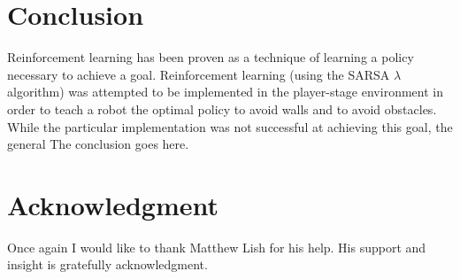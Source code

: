 \documentclass[conference]{IEEEtran}
\begin{document}
%



\section{Conclusion}
Reinforcement learning has been proven as a technique of learning a policy necessary to achieve a goal. 
Reinforcement learning (using the SARSA $\lambda$ algorithm) was attempted to be implemented in the player-stage environment in order to teach a robot the optimal policy to avoid walls and to avoid obstacles.
While the particular implementation was not successful at achieving this goal, the general 
The conclusion goes here.



\section*{Acknowledgment}
Once again I would like to thank Matthew Lish for his help.  His support and insight is gratefully acknowledgment.



\end{document}
